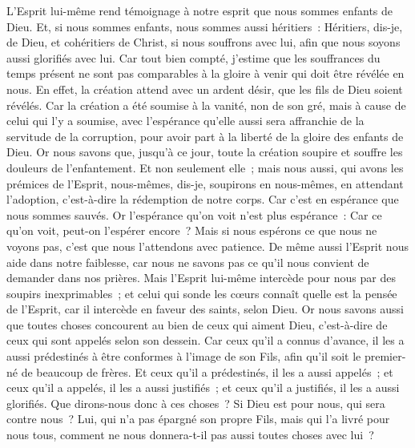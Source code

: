 \begin{multicols}{2}
L'Esprit lui-même rend témoignage à notre esprit que nous sommes enfants de Dieu.
Et, si nous sommes enfants, nous sommes aussi héritiers~: Héritiers, dis-je, de Dieu, et cohéritiers de Christ, si nous souffrons avec lui, afin que nous soyons aussi glorifiés avec lui.
Car tout bien compté, j'estime que les souffrances du temps présent ne sont pas comparables à la gloire à venir qui doit être révélée en nous.
En effet, la création attend avec un ardent désir, que les fils de Dieu soient révélés.
Car la création a été soumise à la vanité, non de son gré, mais à cause de celui qui l'y a soumise,
avec l'espérance qu'elle aussi sera affranchie de la servitude de la corruption, pour avoir part à la liberté de la gloire des enfants de Dieu.
Or nous savons que, jusqu'à ce jour, toute la création soupire et souffre les douleurs de l'enfantement.
Et non seulement elle~; mais nous aussi, qui avons les prémices de l'Esprit, nous-mêmes, dis-je, soupirons en nous-mêmes, en attendant l'adoption, c'est-à-dire la rédemption de notre corps.
Car c'est en espérance que nous sommes sauvés. Or l'espérance qu'on voit n'est plus espérance~: Car ce qu'on voit, peut-on l'espérer encore~?
Mais si nous espérons ce que nous ne voyons pas, c'est que nous l'attendons avec patience.
De même aussi l'Esprit nous aide dans notre faiblesse, car nous ne savons pas ce qu'il nous convient de demander dans nos prières. Mais l'Esprit lui-même intercède pour nous par des soupirs inexprimables~;
et celui qui sonde les cœurs connaît quelle est la pensée de l'Esprit, car il intercède en faveur des saints, selon Dieu.
Or nous savons aussi que toutes choses concourent au bien de ceux qui aiment Dieu, c'est-à-dire de ceux qui sont appelés selon son dessein.
Car ceux qu'il a connus d'avance, il les a aussi prédestinés à être conformes à l'image de son Fils, afin qu'il soit le premier-né de beaucoup de frères.
Et ceux qu'il a prédestinés, il les a aussi appelés~; et ceux qu'il a appelés, il les a aussi justifiés~; et ceux qu'il a justifiés, il les a aussi glorifiés.
Que dirons-nous donc à ces choses~? Si Dieu est pour nous, qui sera contre nous~?
Lui, qui n'a pas épargné son propre Fils, mais qui l'a livré pour nous tous, comment ne nous donnera-t-il pas aussi toutes choses avec lui~?

\end{multicols}
